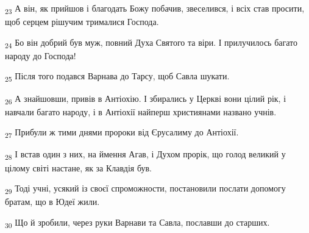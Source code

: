 \begin{tcolorbox}
\textsubscript{23} А він, як прийшов і благодать Божу побачив, звеселився, і всіх став просити, щоб серцем рішучим трималися Господа.
\end{tcolorbox}
\begin{tcolorbox}
\textsubscript{24} Бо він добрий був муж, повний Духа Святого та віри. І прилучилось багато народу до Господа!
\end{tcolorbox}
\begin{tcolorbox}
\textsubscript{25} Після того подався Варнава до Тарсу, щоб Савла шукати.
\end{tcolorbox}
\begin{tcolorbox}
\textsubscript{26} А знайшовши, привів в Антіохію. І збирались у Церкві вони цілий рік, і навчали багато народу, і в Антіохії найперш християнами названо учнів.
\end{tcolorbox}
\begin{tcolorbox}
\textsubscript{27} Прибули ж тими днями пророки від Єрусалиму до Антіохії.
\end{tcolorbox}
\begin{tcolorbox}
\textsubscript{28} І встав один з них, на ймення Агав, і Духом прорік, що голод великий у цілому світі настане, як за Клавдія був.
\end{tcolorbox}
\begin{tcolorbox}
\textsubscript{29} Тоді учні, усякий із своєї спроможности, постановили послати допомогу братам, що в Юдеї жили.
\end{tcolorbox}
\begin{tcolorbox}
\textsubscript{30} Що й зробили, через руки Варнави та Савла, пославши до старших.
\end{tcolorbox}
